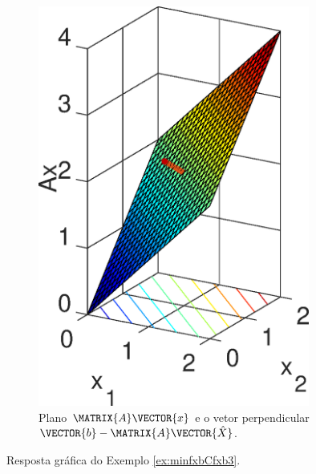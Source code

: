 \begin{SolutionT}
\begin{figure}[h!]
\begin{subfigure}[b]{0.32\textwidth}
         \includegraphics[width=0.98\textwidth]{chapters/minimization-fx/mfiles/ax1/surfcax.eps}
         \caption{Plano $\MATRIX{A}\VECTOR{x}$ e o vetor perpendicular $\VECTOR{b}-\MATRIX{A}\VECTOR{\hat{X}}$.}
         \label{fig:ex:minAxbCAxb:b}
     \end{subfigure}
        \caption{Resposta gráfica do Exemplo \ref{ex:minfxbCfxb3}. }
        \label{fig:ex:minAxbCAxb}
\end{figure}

\end{SolutionT}

